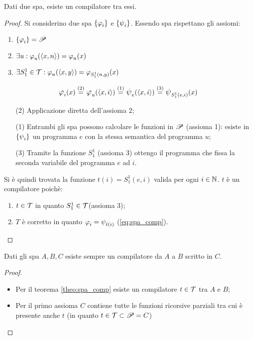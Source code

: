 \begin{theorem}\label{theo:spa_comp}
    Dati due spa, esiste un compilatore tra essi.
\end{theorem}
\begin{proof}
    Si considerino due spa $\sistProg$ e $\sistProgW$. Essendo spa rispettano gli
    assiomi:
    \begin{enumerate}
        \item $\sistProg=\ricPar$
        \item $\exists u: \semanticaRAM_u(\cantor{x,n})=
            \semanticaRAM_n(x)$
        \item $\exists S_1^1\in\ricTot:\semanticaRAM_n(\cantor{x,y})=
            \semanticaRAM_{S_1^1(n,y)}(x)$
    \end{enumerate}

    \begin{equation}\label{eq:spa_comp}
        \semanticaRAM_i(x)\overset{(2)}{=} 
        \semanticaRAM_u(\cantor{x,i})\overset{(1)}{=}
        \semanticaWHILE_e(\cantor{x,i})\overset{(3)}{=}
        \semanticaWHILE_{S_1^1(e,i)}(x)
    \end{equation}
    \vspace{-.5em}

    \begin{enumerate}
        \item[(2)] Applicazione diretta dell'assioma 2;
        \item[(1)] Entrambi gli spa possono calcolare le funzioni in $\mathscr{P}$
            (assioma 1): esiste in $\sistProgW$ un programma $e$ con la stessa semantica
            del programma $u$;
        \item[(3)] Tramite la funzione $S_1^1$ (assioma 3) ottengo il programma che fissa
            la seconda variabile del programma $e$ ad $i$.
    \end{enumerate}

    Si è quindi trovata la funzione $t(i)=S_1^1(e,i)$ valida per ogni $i\in\mathbb{N}$.
    $t$ è un compilatore poichè:
    \begin{enumerate}
        \item $t\in\mathcal{T}$ in quanto $S_1^1\in\mathcal{T}$(assioma 3);
        \item $T$ è corretto in quanto $\semanticaRAM_i=\semanticaWHILE_{t(i)}$
         (\ref{eq:spa_comp}).
    \end{enumerate}
\end{proof}
\begin{corollario}
    Dati gli spa $A,B,C$ esiste sempre un compilatore da $A$ a $B$ scritto
    in $C$. 
\end{corollario}
\begin{proof}\phantom{x}
    \begin{itemize}
        \item Per il teorema \ref{theo:spa_comp} esiste un compilatore $t\in\mathcal{T}$
            tra $A$ e $B$;
        \item Per il primo assioma $C$ contiene tutte le funzioni ricorsive parziali
            tra cui è presente anche $t$ (in quanto $t\in\mathcal{T}\subset\mathscr{P}=C$)
    \end{itemize}
\end{proof}

